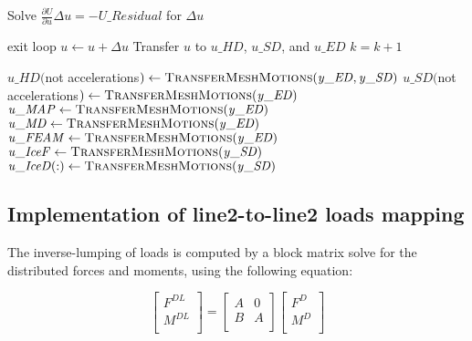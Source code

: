 \documentclass[10pt,letterpaper,oneside,notitlepage]{article}
\begin{document}
\begin{algorithmic}[1]
      \State Solve  $\frac{\partial U}{\partial u} \Delta u = - \mathit{U\_Residual}$ for $\Delta u$

      \State    
       
         \State exit loop
      \EndIf
      \State
      \State $u \gets u + \Delta u$
      \State Transfer $u$ to $\mathit{u\_HD}$, $\mathit{u\_SD}$, and $\mathit{u\_ED}$
      \State $k=k+1$
      
   \EndLoop   
   
   \State{}
   \State 
   
   \State$\mathit{u\_HD}($not accelerations$) \gets \Call{TransferMeshMotions}{\mathit{y\_ED},\mathit{y\_SD}}$
   \State$\mathit{u\_SD}($not accelerations$) \gets \Call{TransferMeshMotions}{\mathit{y\_ED}}$
  \State 
   \State $\mathit{u\_MAP}     \gets \Call{TransferMeshMotions}{\mathit{y\_ED}}$
   \State $\mathit{u\_MD}      \gets \Call{TransferMeshMotions}{\mathit{y\_ED}}$
   \State $\mathit{u\_FEAM}    \gets \Call{TransferMeshMotions}{\mathit{y\_ED}}$
   \State $\mathit{u\_IceF}    \gets \Call{TransferMeshMotions}{\mathit{y\_SD}}$
   \State $\mathit{u\_IceD(:)} \gets \Call{TransferMeshMotions}{\mathit{y\_SD}}$
         
\EndProcedure

\end{algorithmic}

\subsection {Implementation of line2-to-line2 loads mapping}
The inverse-lumping of loads is computed by a block matrix solve for the distributed forces and moments, 
using the following equation:

\begin{equation}
\label{EqLump}
   \begin{bmatrix}
   F^{DL} \\
   M^{DL} \\
   \end{bmatrix}
=
   \begin{bmatrix}
      A & 0 \\
      B & A \\   
   \end{bmatrix}
   \begin{bmatrix}
   F^{D} \\
   M^{D} \\
   \end{bmatrix}
\end{equation}
\end{document}
